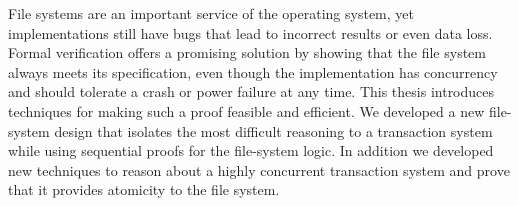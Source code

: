 File systems are an important service of the operating system, yet
implementations still have bugs that lead to incorrect results or even data loss. Formal
verification offers a promising solution by showing that the file system always
meets its specification, even though the implementation has concurrency and
should tolerate a crash or power failure at any time. This thesis introduces
techniques for making such a proof feasible and efficient. We developed a new
file-system design that isolates the most difficult reasoning to a transaction
system while using sequential proofs for the file-system logic. In addition we
developed new techniques to reason about a highly concurrent transaction system
and prove that it provides atomicity to the file system.

%
